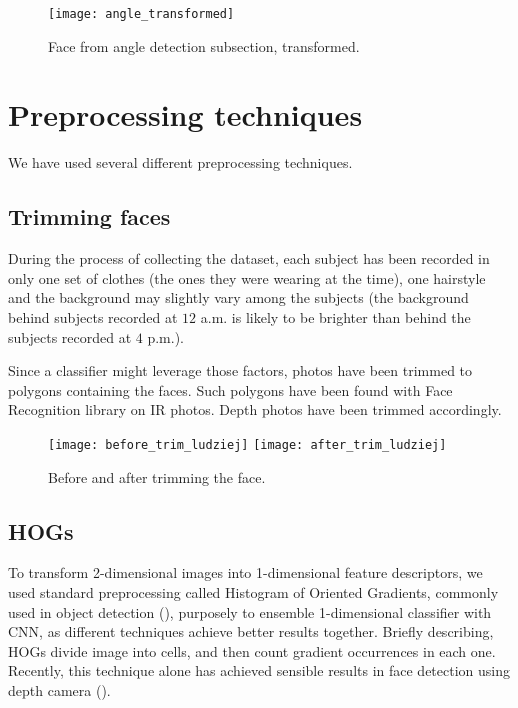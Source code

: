         \begin{figure}[H]
        \caption{Face from angle detection subsection, transformed.}
        \centering
        \texttt{[image: angle\_transformed]}
        \end{figure}

    \section{Preprocessing techniques}
    We have used several different preprocessing techniques.
        \subsection*{Trimming faces}
        \label{sec:trimming}
        During the process of collecting the dataset, each subject has been
        recorded in only one set of clothes (the ones they were wearing at the
        time), one hairstyle and the background may slightly vary among the
        subjects (the background behind subjects recorded at $12$ a.m. is
        likely to be brighter than behind the subjects recorded at $4$ p.m.).

        Since a classifier might leverage those factors, photos have been
        trimmed to polygons containing the faces. Such polygons have been
        found with Face Recognition library \cite{facerecog} on IR photos.
        Depth photos have been trimmed accordingly.

        \begin{figure}[H]
        \caption{Before and after trimming the face.}
        \centering
        \texttt{[image: before\_trim\_ludziej]}
        \texttt{[image: after\_trim\_ludziej]}
        \end{figure}

        \subsection*{HOGs}
        To transform 2-dimensional images into 1-dimensional feature descriptors,
        we used standard preprocessing called Histogram of Oriented Gradients, commonly used in
        object detection (\citeauthor{hog}), purposely to ensemble 1-dimensional classifier with CNN,
        as different techniques achieve better results together. Briefly describing,
        HOGs divide image into cells, and then count gradient occurrences in each one.
        Recently, this technique alone has achieved sensible results in face detection using depth camera (\citeauthor{rgbdhog}).

